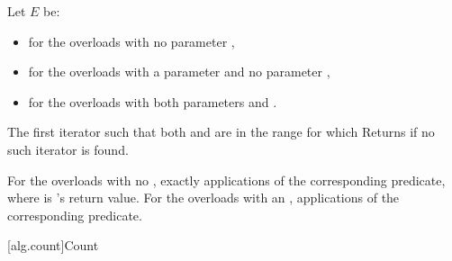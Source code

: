 \begin{itemdescr}
\begin{addedblock}
\pnum
Let $E$ be:
\begin{itemize}
\item {} for the overloads with no parameter ,
\item {} for the overloads with a parameter  and no parameter ,
\item {} for the overloads with both parameters  and .
\end{itemize}
\end{addedblock}

\pnum
\returns
The first iterator
such that both
and
are in
the range
for which 
Returns 
if no such iterator is found.

\pnum
\complexity
For the overloads with no , exactly
applications of the corresponding predicate, where  is
's
return value.
  For the overloads with an ,
 applications of the corresponding predicate.
\end{itemdescr}

[alg.count]{Count}


